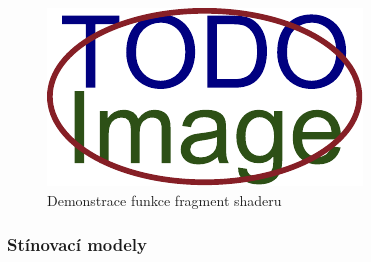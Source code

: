 \begin{figure}[H]
	\centering
	\includegraphics[width=.5\linewidth]{obrazky-figures/placeholder.pdf}
	\caption{Demonstrace funkce fragment shaderu}
	\label{fig:opengl:fragment-shader}
\end{figure}

\subsubsection*{Stínovací modely}\label{ch:teorie:opengl:shading}


